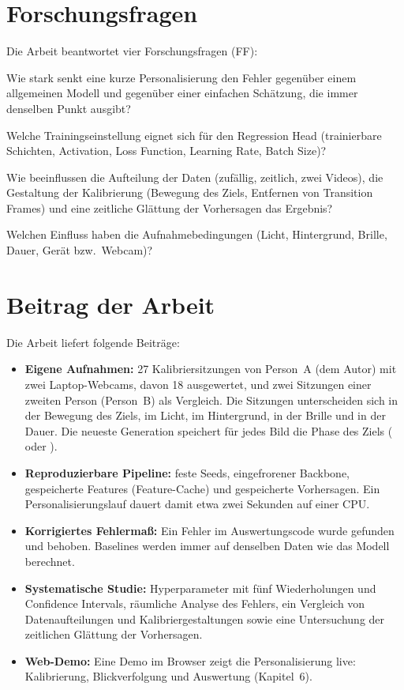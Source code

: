 \section{Forschungsfragen}
\label{sec:forschungsfragen}
Die Arbeit beantwortet vier Forschungsfragen (FF):
\begin{description}[leftmargin=1.2cm, style=nextline]
  \item[FF1] Wie stark senkt eine kurze Personalisierung den Fehler gegenüber
        einem allgemeinen Modell und gegenüber einer einfachen Schätzung, die
        immer denselben Punkt ausgibt?
  \item[FF2] Welche Trainingseinstellung eignet sich für den Regression Head
        (trainierbare Schichten, Activation, Loss Function, Learning Rate,
        Batch Size)?
  \item[FF3] Wie beeinflussen die Aufteilung der Daten (zufällig, zeitlich,
        zwei Videos), die Gestaltung der Kalibrierung (Bewegung des Ziels,
        Entfernen von Transition Frames) und eine zeitliche Glättung der
        Vorhersagen das Ergebnis?
  \item[FF4] Welchen Einfluss haben die Aufnahmebedingungen (Licht,
        Hintergrund, Brille, Dauer, Gerät bzw.\ Webcam)?
\end{description}

\section{Beitrag der Arbeit}
\label{sec:beitrag}
Die Arbeit liefert folgende Beiträge:
\begin{itemize}
  \item \textbf{Eigene Aufnahmen:} 27 Kalibriersitzungen von Person~A (dem
        Autor) mit zwei Laptop-Webcams, davon 18 ausgewertet, und zwei
        Sitzungen einer zweiten Person (Person~B) als Vergleich. Die Sitzungen unterscheiden sich in der
        Bewegung des Ziels, im Licht, im Hintergrund, in der Brille und in der
        Dauer. Die neueste Generation speichert für jedes
        Bild die Phase des Ziels ( oder ).
  \item \textbf{Reproduzierbare Pipeline:} feste Seeds, eingefrorener Backbone,
        gespeicherte Features (Feature-Cache) und gespeicherte Vorhersagen.
        Ein Personalisierungslauf dauert damit etwa zwei Sekunden auf einer CPU.
  \item \textbf{Korrigiertes Fehlermaß:} Ein Fehler im Auswertungscode wurde
        gefunden und behoben. Baselines werden immer auf denselben Daten wie
        das Modell berechnet.
  \item \textbf{Systematische Studie:} Hyperparameter mit fünf Wiederholungen
        und Confidence Intervals, räumliche Analyse des Fehlers, ein
        Vergleich von Datenaufteilungen und Kalibriergestaltungen sowie eine
        Untersuchung der zeitlichen Glättung der Vorhersagen.
  \item \textbf{Web-Demo:} Eine Demo im Browser zeigt die Personalisierung
        live: Kalibrierung, Blickverfolgung und Auswertung (Kapitel~6).
\end{itemize}

